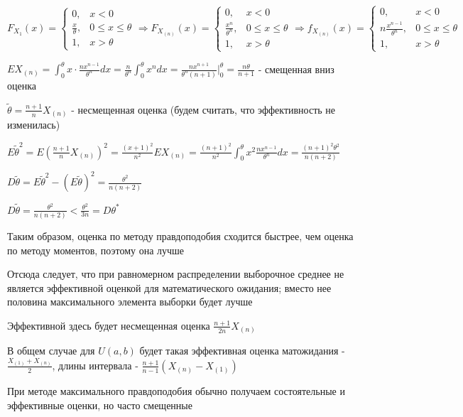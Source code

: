 \documentclass[12pt]{article}
\begin{document}
$F_{X_1} (x) = \begin{cases}
    0, & x < 0 \\
    \frac{x}{\theta}, & 0 \leq x \leq \theta \\
    1, & x > \theta
\end{cases} \Longrightarrow F_{X_{(n)}}(x) = \begin{cases}
    0, & x < 0 \\
    \frac{x^n}{\theta^n}, & 0 \leq x \leq \theta \\
    1, & x > \theta
\end{cases} \Longrightarrow f_{X_{(n)}}(x) = \begin{cases}
    0, & x < 0 \\
    n\frac{x^{n - 1}}{\theta^n}, & 0 \leq x \leq \theta \\
    1, & x > \theta
\end{cases}$

$EX_{(n)} = \int_0^\theta x \cdot \frac{nx^{n - 1}}{\theta^n} dx = \frac{n}{\theta^n} \int_0^\theta x^n dx = \frac{n x^{n + 1}}{\theta^n (n + 1)} \Big|_0^\theta = 
\frac{n\theta}{n + 1}$ - смещенная вниз оценка

$\tilde{\theta} = \frac{n + 1}{n} X_{(n)}$ - несмещенная оценка (будем считать, что эффективность не изменилась)

$E\tilde{\theta}^2 = E(\frac{n + 1}{n} X_{(n)})^2 = \frac{(x + 1)^2}{n^2} E X_{(n)} = \frac{(n + 1)^2}{n^2} \int_0^\theta x^2 \frac{n x^{n - 1}}{\theta^n} dx = 
\frac{(n + 1)^2 \theta^2}{n (n + 2)}$

$D\tilde{\theta} = E\tilde{\theta}^2 - (E\tilde{\theta})^2 = \frac{\theta^2}{n(n + 2)}$

$D\tilde{\theta} = \frac{\theta^2}{n(n + 2)} < \frac{\theta^2}{3n} = D\theta^*$

Таким образом, оценка по методу правдоподобия сходится быстрее, чем оценка по методу моментов, поэтому она лучше

Отсюда следует, что при равномерном распределении выборочное среднее не является эффективной оценкой
для математического ожидания; вместо нее половина максимального элемента выборки будет лучше

\Nota Эффективной здесь будет несмещенная оценка $\frac{n + 1}{2n} X_{(n)}$

В общем случае для $U(a, b)$ будет такая эффективная оценка матожидания - $\frac{X_{(1)} + X_{(n)}}{2}$, длины интервала - $\frac{n + 1}{n - 1} (X_{(n)} - X_{(1)})$

\Nota При методе максимального правдоподобия обычно получаем состоятельные и эффективные оценки, но часто смещенные
\end{document}
